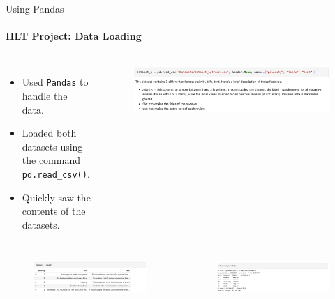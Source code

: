 \documentclass{beamer}
\theoremstyle{definition}
\theoremstyle{plain}
\begin{document}
\begin{frame}{Using Pandas}
\framesubtitle{HLT Project: Data Loading}
{\small 
\begin{columns}
    \begin{itemize}
        \item Used \texttt{Pandas} to handle the data.
        \item Loaded both datasets using the command \texttt{pd.read\_csv()}.
        \item Quickly saw the contents of the datasets.
    \end{itemize}

    \begin{figure}
        \centering
        \includegraphics[scale=0.23]{Figures/read2.png}
    \end{figure}
\end{columns}

\begin{columns}
        \begin{figure}
        \centering
        \includegraphics[scale=0.25]{Figures/head.png}
    \end{figure}

        \begin{figure}
        \centering
        \includegraphics[scale=0.25]{Figures/info.png}
    \end{figure}
\end{columns}
}
\end{frame}
\end{document}
